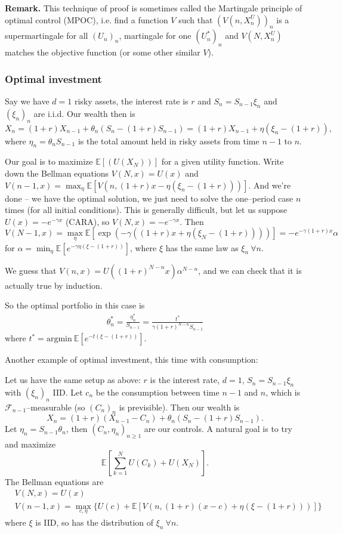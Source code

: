 \documentclass{article}
\theoremstyle{definition}
\begin{document}
\textbf{Remark.} This technique of proof is sometimes called the Martingale principle of optimal control (MPOC), i.e. find a function $V$ such that $(V(n,X_n^U))_n$ is a supermartingale for all $(U_n)_n$, martingale for one $(U^*_n)_n$ and $V(N,X_n^U)$ matches the objective function (or some other similar $V$).

\subsubsection*{Optimal investment}

Say we have $d=1$ risky assets, the interest rate is $r$ and $S_n=S_{n-1}\xi_n$ and $(\xi_n)_n$ are i.i.d. Our wealth then is \[
X_n= (1+r)X_{n-1}+\theta_n(S_n-(1+r)S_{n-1}) = (1+r)X_{n-1}+ \eta (\xi_n-(1+r)),
\]
where $\eta_n=\theta_n S_{n-1}$ is the total amount held in risky assets from time $n-1$ to $n$.

Our goal is to maximize $\mathbb{E}[(U(X_N))]$ for a given utility function. Write down the Bellman equations $V(N,x)=U(x)$ and $V(n-1,x) = \max_{\eta} \mathbb{E}[V(n,(1+r)x-\eta(\xi_n-(1+r)))]$. And we're done -- we have the optimal solution, we just need to solve the one--period case $n$ times (for all initial conditions). This is generally difficult, but let us suppose $U(x)=-e^{-\gamma x}$ (CARA), so $V(N,x)= -e^{-\gamma x}$. Then \[
V(N-1,x) = \max_{\eta} \mathbb{E}[\exp \left(-\gamma((1+r)x + \eta(\xi_N - (1+r)))\right)] = -e^{-\gamma(1+r)x}\alpha
\]
for $\alpha = \min_{\eta} \mathbb{E}[e^{-\gamma \eta(\xi-(1+r))}]$, where $\xi$ has the same law as $\xi_n ~\forall n$.

We guess that $V(n,x)=U((1+r)^{N-n}x)\alpha^{N-n}$, and we can check that it is actually true by induction.

So the optimal portfolio in this case is 
\begin{align*}
    \theta^*_n = \frac{\eta_n^*}{S_{n-1}} = \frac{t^*}{\gamma(1+r)^{N-n}S_{n-1}}
\end{align*}
where $t^* = \text{argmin}~\mathbb{E}[e^{-t(\xi-(1+r))}]$.
\vspace{1mm}

Another example of optimal investment, this time with consumption:

\vspace{1mm}

Let us have the same setup as above: $r$ is the interest rate, $d=1$, $S_n=S_{n-1}\xi_n$ with $(\xi_n)_n$ IID. Let $c_n$ be the consumption between time $n-1$ and $n$, which is $\mathcal{F}_{n-1}$--measurable (so $(C_n)_n$ is previsible). Then our wealth is \[
X_n = (1+r)(X_{n-1}-C_n) + \theta_n(S_n-(1+r)S_{n-1}).
\]
Let $\eta_n=S_{n-1}\theta_n$, then $(C_n,\eta_n)_{n\ge 1}$ are our controls. A natural goal is to try and maximize \[
    \mathbb{E}\left[\sum_{k=1}^{N} U(C_k)+U(X_N)\right].
\]
The Bellman equations are 
\begin{align*}
    &V(N,x)=U(x)\\
    &V(n-1,x) = \max_{c,\eta} \{U(c) + \mathbb{E}[V(n,(1+r)(x-c) + \eta(\xi-(1+r)))]\}
\end{align*}
where $\xi$ is IID, so has the distribution of $\xi_n ~\forall n$.
\end{document}

